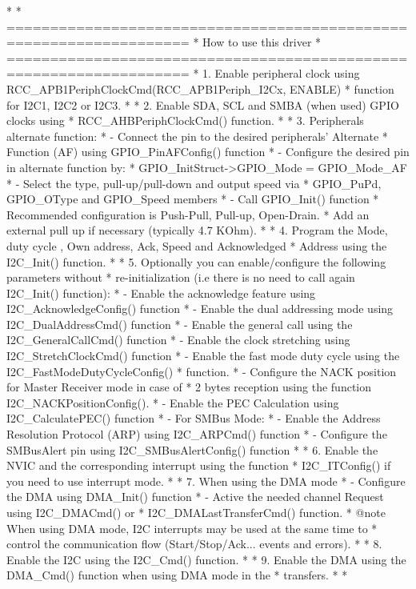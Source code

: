 \begin{DoxyVerb}*    
*          ===================================================================
*                                 How to use this driver
*          ===================================================================
*          1. Enable peripheral clock using RCC_APB1PeriphClockCmd(RCC_APB1Periph_I2Cx, ENABLE)
*             function for I2C1, I2C2 or I2C3.
*
*          2. Enable SDA, SCL  and SMBA (when used) GPIO clocks using 
*             RCC_AHBPeriphClockCmd() function. 
*
*          3. Peripherals alternate function: 
*                 - Connect the pin to the desired peripherals' Alternate 
*                   Function (AF) using GPIO_PinAFConfig() function
*                 - Configure the desired pin in alternate function by:
*                   GPIO_InitStruct->GPIO_Mode = GPIO_Mode_AF
*                 - Select the type, pull-up/pull-down and output speed via 
*                   GPIO_PuPd, GPIO_OType and GPIO_Speed members
*                 - Call GPIO_Init() function
*                 Recommended configuration is Push-Pull, Pull-up, Open-Drain.
*                 Add an external pull up if necessary (typically 4.7 KOhm).      
*        
*          4. Program the Mode, duty cycle , Own address, Ack, Speed and Acknowledged
*             Address using the I2C_Init() function.
*
*          5. Optionally you can enable/configure the following parameters without
*             re-initialization (i.e there is no need to call again I2C_Init() function):
*              - Enable the acknowledge feature using I2C_AcknowledgeConfig() function
*              - Enable the dual addressing mode using I2C_DualAddressCmd() function
*              - Enable the general call using the I2C_GeneralCallCmd() function
*              - Enable the clock stretching using I2C_StretchClockCmd() function
*              - Enable the fast mode duty cycle using the I2C_FastModeDutyCycleConfig()
*                function.
*              - Configure the NACK position for Master Receiver mode in case of 
*                2 bytes reception using the function I2C_NACKPositionConfig().  
*              - Enable the PEC Calculation using I2C_CalculatePEC() function
*              - For SMBus Mode: 
*                   - Enable the Address Resolution Protocol (ARP) using I2C_ARPCmd() function
*                   - Configure the SMBusAlert pin using I2C_SMBusAlertConfig() function
*
*          6. Enable the NVIC and the corresponding interrupt using the function 
*             I2C_ITConfig() if you need to use interrupt mode. 
*
*          7. When using the DMA mode 
*                   - Configure the DMA using DMA_Init() function
*                   - Active the needed channel Request using I2C_DMACmd() or
*                     I2C_DMALastTransferCmd() function.
*              @note When using DMA mode, I2C interrupts may be used at the same time to
*                    control the communication flow (Start/Stop/Ack... events and errors).
* 
*          8. Enable the I2C using the I2C_Cmd() function.
* 
*          9. Enable the DMA using the DMA_Cmd() function when using DMA mode in the 
*             transfers. 
*
*  \end{DoxyVerb}


